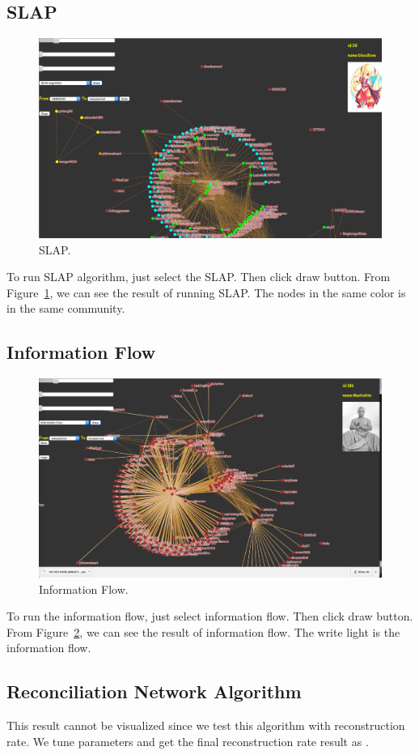 \documentclass{article}
\begin{document}
\subsection{SLAP}
\begin{figure}[h]
  \centering
  \includegraphics[width=0.8\columnwidth]{slap.png}
  \caption{SLAP.}
  \label{fig:slap}
\end{figure}
To run SLAP algorithm, just select the SLAP. Then click draw button. From Figure~\ref{fig:slap}, we can see the result of running SLAP. The nodes in the same color is in the same community. \\ 

\subsection{Information Flow}
\begin{figure}[h]
  \centering
  \includegraphics[width=0.8\columnwidth]{if.png}
  \caption{Information Flow.}
  \label{fig:if}
\end{figure}
To run the information flow, just select information flow. Then click draw button. From Figure~\ref{fig:if}, we can see the result of information flow. The write light is the information flow. \\

\subsection{Reconciliation Network Algorithm}
This result cannot be visualized since we test this algorithm with reconstruction rate. We tune parameters and get the final reconstruction rate result as .
 
\end{document}
